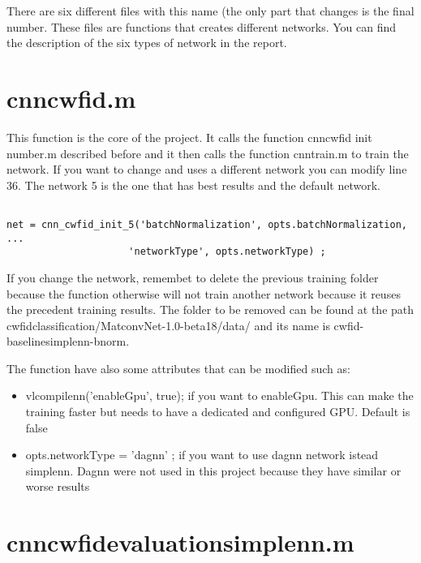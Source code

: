\documentclass[]{report}
\begin{document}
There are six different files with this name (the only part that changes is the final number. These files are functions that creates  different networks. You can find the description of the six types of network in the report.

\section{cnn\textunderscore cwfid.m}

This function is the core of the project. It calls the function cnn\textunderscore cwfid \textunderscore init \textunderscore *number.m described before and it then calls the function cnn\textunderscore train.m to train the network. If you want to change and uses a different network you can modify line 36. The network 5 is the one that has best results and the default network.

\begin{lstlisting}

net = cnn_cwfid_init_5('batchNormalization', opts.batchNormalization, ...
                     'networkType', opts.networkType) ;

\end{lstlisting}

If you change the network, remembet to delete the previous training folder because the function otherwise will not train another network because it reuses the precedent training results. The folder to be removed can be found at the path  cwfid\textunderscore classification/MatconvNet-1.0-beta18/data/ and its name is cwfid-baselinesimplenn-bnorm. 

The function have also some attributes that can be modified such as:

\begin{itemize}

	\item vl\textunderscore compilenn('enableGpu', true); if you want to enableGpu. This can make the training faster but needs to have a dedicated and configured GPU. Default is false
	\item opts.networkType = 'dagnn' ; if you want to use dagnn network istead simplenn. Dagnn were not used in this project because they have similar or worse results
	

\end{itemize}


\section{cnn\textunderscore cwfid\textunderscore evaluation\textunderscore simplenn.m}
\end{document}
